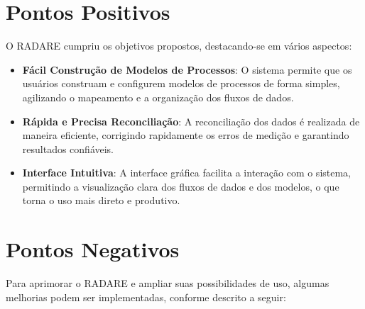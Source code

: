 \label{Cap:Conclusao}

\section{Pontos Positivos}

O RADARE cumpriu os objetivos propostos, destacando-se em vários aspectos:

\begin{itemize}
    \item \textbf{Fácil Construção de Modelos de Processos}: O sistema permite que os usuários construam e configurem modelos de processos de forma simples, agilizando o mapeamento e a organização dos fluxos de dados.

    \item \textbf{Rápida e Precisa Reconciliação}: A reconciliação dos dados é realizada de maneira eficiente, corrigindo rapidamente os erros de medição e garantindo resultados confiáveis.

    \item \textbf{Interface Intuitiva}: A interface gráfica facilita a interação com o sistema, permitindo a visualização clara dos fluxos de dados e dos modelos, o que torna o uso mais direto e produtivo.
\end{itemize}

\section{Pontos Negativos}

Para aprimorar o RADARE e ampliar suas possibilidades de uso, algumas melhorias podem ser implementadas, conforme descrito a seguir:

